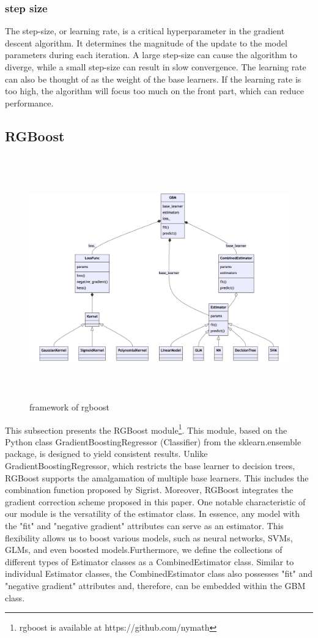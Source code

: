 \subsubsection{step size}
The step-size, or learning rate, is a critical hyperparameter in the gradient descent algorithm. It determines the magnitude of the update to the model parameters during each iteration. A large step-size can cause the algorithm to diverge, while a small step-size can result in slow convergence. The learning rate can also be thought of as the weight of the base learners. If the learning rate is too high, the algorithm will focus too much on the front part, which can reduce performance.
\subsection{RGBoost}
\begin{figure}[htb]
	\centering
	\includegraphics[height=10.5cm]{figure/rgboost.png}
	\caption{framework of rgboost}
\end{figure}
This subsection presents the RGBoost module\footnote{rgboost is available at https://github.com/nymath}. This module, based on the Python class GradientBoostingRegressor (Classifier) from the sklearn.ensemble package, is designed to yield consistent results. Unlike GradientBoostingRegressor, which restricts the base learner to decision trees, RGBoost supports the amalgamation of multiple base learners. This includes the combination function proposed by Sigrist\cite{sigrist2021ktboost}. Moreover, RGBoost integrates the gradient correction scheme proposed in this paper. One notable characteristic of our module is the versatility of the estimator class. In essence, any model with the "fit" and "negative gradient" attributes can serve as an estimator. This flexibility allows us to boost various models, such as neural networks, SVMs, GLMs, and even boosted models.Furthermore, we define the collections of different types of Estimator classes as a CombinedEstimator class. Similar to individual Estimator classes, the CombinedEstimator class also possesses "fit" and "negative gradient" attributes and, therefore, can be embedded within the GBM class.










